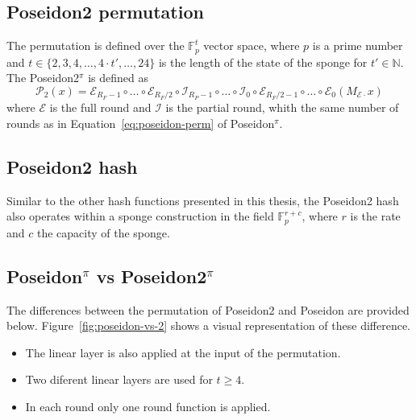 \subsection*{Poseidon2 permutation}
The permutation is defined over the $\mathbb{F}_p^t$ vector space, where $p$ is a prime number and $t \in \{2,3,4,\dots,4\cdot t',\dots,24\}$ is the length of the state of the sponge for $t' \in \mathbb{N}$. The Poseidon2$^\pi$ is defined as
\begin{equation}
    \mathcal{P}_2(x) = \mathcal{E}_{R_F-1} \circ \dots \circ \mathcal{E}_{R_F/2} \circ \mathcal{I}_{R_P-1} \circ \dots \circ \mathcal{I}_0 \circ \mathcal{E}_{R_F/{2-1}} \circ \dots \circ \mathcal{E}_0(M_{\mathcal{E}\cdot}x)
\end{equation}
where $\mathcal{E}$ is the full round and $\mathcal{I}$ is the partial round, whith the same number of rounds as in Equation~\ref{eq:poseidon-perm} of Poseidon$^\pi$.

\subsection*{Poseidon2 hash}
Similar to the other hash functions presented in this thesis, the Poseidon2 hash also operates within a sponge construction in the field $\mathbb{F}_p^{r+c}$, where $r$ is the rate and $c$ the capacity of the sponge.

\subsection*{Poseidon$^\pi$ vs Poseidon2$^\pi$}
The differences between the permutation of Poseidon2 and Poseidon are provided below. Figure~\ref{fig:poseidon-vs-2} shows a visual representation of these difference.
\begin{itemize}
    \item The linear layer is also applied at the input of the permutation.
    \item Two diferent linear layers are used for $t\geq4$.
    \item In each round only one round function is applied.
\end{itemize}

